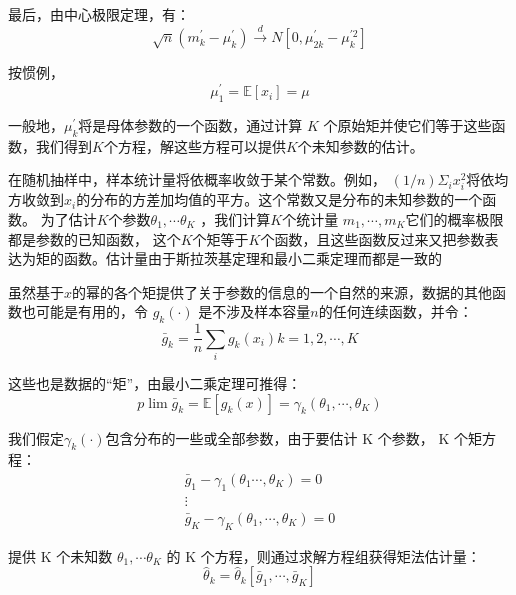 最后，由中心极限定理，有：
$$ \sqrt{n}\left(m_{k}^{\prime}-\mu_{k}^{\prime}\right) \stackrel{d}{\longrightarrow} N\left[0, \mu_{2 k}^{\prime}-\mu_{k}^{\prime 2}\right] $$

按惯例，
$$ \mu_{1}^{\prime} = \mathbb{E}\left[x_{i}\right]=\mu $$

一般地，$ \mu_k^{\prime} $将是母体参数的一个函数，通过计算 $ K $ 个原始矩并使它们等于这些函数，我们得到$ K $个方程，解这些方程可以提供$ K $个未知参数的估计。

在随机抽样中，样本统计量将依概率收敛于某个常数。例如， $ (1 / n) \Sigma_{i} x_{i}^{2} $将依均方收敛到$ x_{i} $的分布的方差加均值的平方。这个常数又是分布的未知参数的一个函数。
为了估计$ K $个参数$ \theta_{1}, \cdots \theta_{K} $ ，我们计算$ K $个统计量  $ m_{1}, \cdots, m_{K} $它们的概率极限都是参数的已知函数，
这个$ K $个矩等于$ K $个函数，且这些函数反过来又把参数表达为矩的函数。估计量由于斯拉茨基定理和最小二乘定理而都是一致的

虽然基于$ x $的幂的各个矩提供了关于参数的信息的一个自然的来源，数据的其他函数也可能是有用的，令 $ g_{k} (\cdot) $ 是不涉及样本容量$ n $的任何连续函数，并令：
$$ \bar{g}_{k}=\frac{1}{n} \sum_{i} g_{k}\left(x_{i}\right) k=1,2, \cdots, K $$

这些也是数据的“矩”，由最小二乘定理可推得：
$$ p \lim \bar{g}_{k}=\mathbb{E}\left[g_{k}(x)\right]=\gamma_{k}\left(\theta_{1}, \cdots, \theta_{K}\right) $$

我们假定$ \gamma_{k}(\cdot) $包含分布的一些或全部参数，由于要估计 K 个参数， K 个矩方程：
$$ \begin{array}{c}
    \bar{g}_{1}-\gamma_{1}\left(\theta_{1} \cdots, \theta_{K}\right)=0 \\
    \vdots \\
    \bar{g}_{K}-\gamma_{K}\left(\theta_{1}, \cdots, \theta_{K}\right)=0
    \end{array} $$

提供 K 个未知数 $ \theta_{1}, \cdots \theta_{K} $  的 K 个方程，则通过求解方程组获得矩法估计量：
$$ \hat{\theta}_{k}=\hat{\theta}_{k}\left[\bar{g}_{1}, \cdots, \bar{g}_{K}\right] $$

